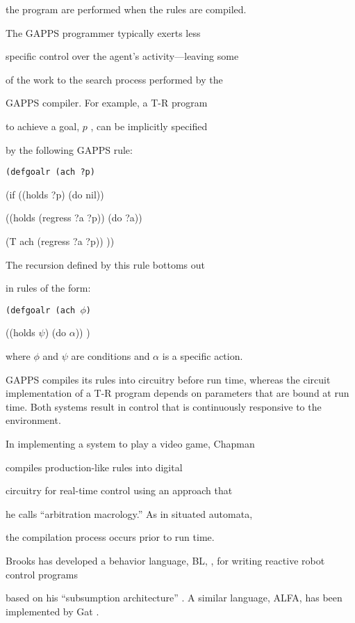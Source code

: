the program are performed when the rules are compiled. 

The GAPPS programmer typically exerts less 

specific control over the agent's activity---leaving some 

of the work to the search process performed by the 

GAPPS compiler.  For example, a T-R program 

to achieve a goal, $p$ , can be implicitly specified 

by the following GAPPS  rule:

{\tt (defgoalr (ach ?p) 


\hspace{1.0in} (if ((holds ?p) (do nil))

\hspace{1.0in} ((holds (regress ?a ?p)) (do ?a)) 


\hspace{1.0in} (T ach (regress ?a ?p))  )) }

\noindent The recursion defined by this rule bottoms out 

in rules of the form: 


{\tt (defgoalr (ach $\phi$) 


\hspace{1.0in}((holds $\psi$) (do $\alpha$)) )}

\noindent where $\phi$ and $\psi$ are conditions and $\alpha$ is a specific  
action.

GAPPS compiles its rules into circuitry before run time, whereas the circuit  
implementation of a T-R program depends on parameters that are bound at run  
time. Both systems result in control that is continuously responsive to the  
environment.

In implementing a system to play a video game, Chapman 

\cite{Chapman} compiles production-like rules into digital 

circuitry for real-time control using an approach that 

he calls ``arbitration macrology.'' As in situated automata, 

the compilation process occurs prior to  run time.

Brooks has developed a behavior language, BL, \cite{Brooks1}, for writing  
reactive robot control programs 

based on his ``subsumption architecture'' \cite{Brooks}.  A similar   
language, {\small ALFA},  has been implemented by Gat \cite{Gat}. 


